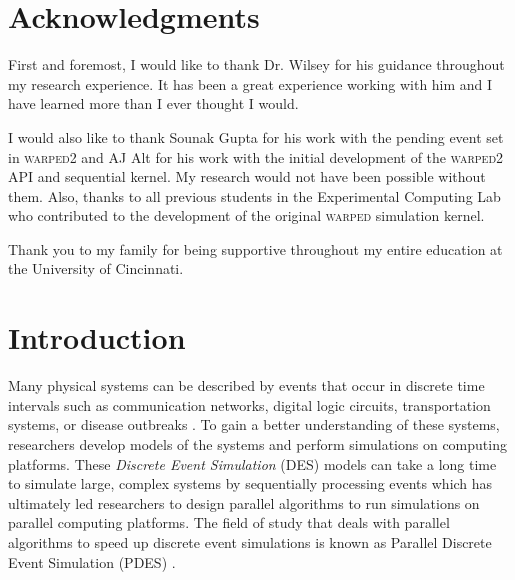 \documentclass[11pt]{book}
\begin{document}


\chapter*{Acknowledgments}

First and foremost, I would like to thank Dr. Wilsey for his guidance throughout my research
experience. It has been a great experience working with him and I have learned more than I
ever thought I would.

I would also like to thank Sounak Gupta for his work with the pending event set in
\textsc{warped2} and AJ Alt for his work with the initial development of the
\textsc{warped2} API and sequential kernel.  My research would not have been possible
without them.  Also, thanks to all previous students in the Experimental Computing Lab who
contributed to the development of the original \textsc{warped} simulation kernel.

Thank you to my family for being supportive throughout my entire education at the
University of Cincinnati.

\tableofcontents    \markright{ }
\listoffigures      \markright{ }
\listoftables       \markright{ }
\listofalgorithms   \markright{ }
\lstlistoflistings  \markright{ }

\clearpage
{} \setcounter{page}{1}

\chapter{Introduction}\label{intro}

Many physical systems can be described by events that occur in discrete time intervals
such as communication networks, digital logic circuits, transportation systems, or disease
outbreaks \cite{law-00}.  To gain a better understanding of these systems, researchers
develop models of the systems and perform simulations on computing platforms.  These
\emph{Discrete Event Simulation} (DES) models can take a long time to simulate large,
complex systems by sequentially processing events which has ultimately led researchers to
design parallel algorithms to run simulations on parallel computing platforms.  The field
of study that deals with parallel algorithms to speed up discrete event simulations is
known as Parallel Discrete Event Simulation (PDES) \cite{fujimoto-90,fujimoto-00}.
\end{document}
